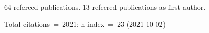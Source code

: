 64 refereed publications. 13 refeered publications as first author.

Total citations~=~2021; h-index~=~23 (2021-10-02)